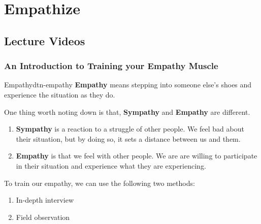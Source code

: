 \documentclass[math,code]{amznotes}
\theoremstyle{remark}
\begin{document}
\tableofcontents

\chapter{Empathize}
\section{Lecture Videos}
\subsection{An Introduction to Training your Empathy Muscle}
\begin{dfnbox}{Empathy}{dtn-empathy}
    {\color{red} \textbf{Empathy}} means stepping into someone else's shoes and experience the situation as they do.
\end{dfnbox}
One thing worth noting down is that, \textbf{Sympathy} and \textbf{Empathy} are different.
\begin{enumerate}
    \item \textbf{Sympathy} is a reaction to a struggle of other people. We feel bad about their situation, but by doing so, it sets a distance between us and them.
    \item \textbf{Empathy} is that we feel with other people. We are are willing to participate in their situation and experience what they are experiencing.
\end{enumerate}
To train our empathy, we can use the following two methods:
\begin{enumerate}
    \item In-depth interview
    \item Field observation
\end{enumerate}
\end{document}
